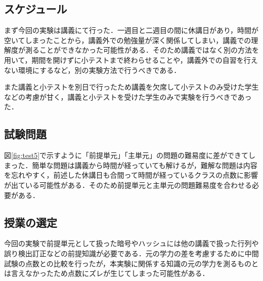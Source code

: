 \documentclass[a4j,12pt]{jsarticle}
\begin{document}
\subsection{スケジュール}
まず今回の実験は講義にて行った．一週目と二週目の間に休講日があり，時間が空いてしまったことから，講義外での勉強量が深く関係してしまい，講義での理解度が測ることができなかった可能性がある．そのため講義ではなく別の方法を用いて，期間を開けずに小テストまで終わらせることや，講義外での自習を行えない環境にするなど，別の実験方法で行うべきである．

また講義と小テストを別日で行ったため講義を欠席して小テストのみ受けた学生などの考慮が甘く，講義と小テストを受けた学生のみで実験を行うべきであった．





\subsection{試験問題}

図\ref{fig:test5}で示すように「前提単元」「主単元」の問題の難易度に差ができてしまった．簡単な問題は講義から時間が経っていても解けるが，難解な問題は内容を忘れやすく，前述した休講日も合間って時間が経っているクラスの点数に影響が出ている可能性がある．そのため前提単元と主単元の問題難易度を合わせる必要がある．
\begin{table}[H]
\centering
\caption{前提知識を用いた単元の平均点の比較}
\label{fig:test5}
\end{table}



\subsection{授業の選定}
今回の実験で前提単元として扱った暗号やハッシュには他の講義で扱った行列や誤り検出訂正などの前提知識が必要である．元の学力の差を考慮するために中間試験の点数との比較を行ったが，本実験に関係する知識の元の学力を測るものとは言えなかったため点数にズレが生じてしまった可能性がある．
\end{document}
